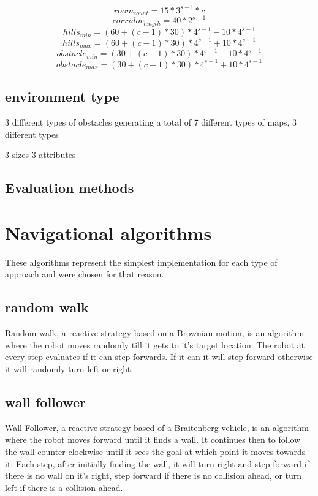 \documentclass[letterpaper, 10 pt, conference]{ieeeconf}  %
\begin{document}
$$
room_{count} = 15 * 3^{s-1} * c
$$
$$
corridor_{length} = 40 * 2^{s-1}
$$
$$
hills_{min} = (60 + (c-1)*30) * 4^{s-1} - 10*4^{s-1}
$$
$$
hills_{max} = (60 + (c-1)*30) * 4^{s-1} + 10*4^{s-1}
$$
$$
obstacle_{min} = (30 + (c-1)*30) * 4^{s-1} - 10*4^{s-1}
$$
$$
obstacle_{max} = (30 + (c-1)*30) * 4^{s-1} + 10*4^{s-1}
$$


\subsection{environment type}


3 different types of obstacles generating a total of 7 different types of maps, 3 different types

3 sizes
3 attributes





\subsection{Evaluation methods}

\section{Navigational algorithms}

These algorithms represent the simplest
implementation for each type of approach and were chosen for that reason.

\subsection{random walk}
Random walk, a reactive strategy based on a Brownian motion, is an algorithm where the robot moves randomly till it gets to it's target location. The robot at every step evaluates if it can step forwards. If it can it will step forward otherwise it will randomly turn left or right.

\subsection{wall follower}
Wall Follower, a reactive strategy based of a Braitenberg vehicle, is an algorithm where the robot moves forward until it finds a wall. It continues then to follow the wall counter-clockwise until it sees the goal at which point it moves towards it. Each step, after initially finding the wall, it will turn right and step forward if there is no wall on it’s right, step forward if there is no collision ahead, or turn left if there is a collision ahead.
\end{document}
